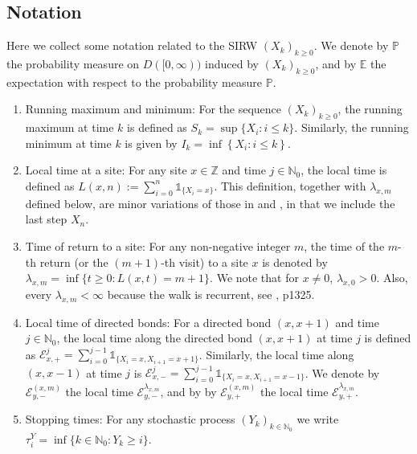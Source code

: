 \documentclass[EJP]{ejpecp} %
\begin{document}
\subsection{Notation}


	Here we collect some notation related to the SIRW $(X_k)_{k \ge 0}$.
	We denote by $\mathbb{P}$ the probability measure on $D([0,\infty))$ induced by $(X_k)_{k\geq 0}$, and by $\mathbb{E}$ the expectation with respect to the probability measure $\mathbb{P}$.
\begin{enumerate}
	\item Running maximum and minimum: For the sequence $(X_k)_{k \ge 0}$, the running maximum at time $k$ is defined as $S_k = \sup\{X_i : i \le k\}$. Similarly, the running minimum at time $k$ is given by $I_k = \inf \left\{X_i: i \le k\right\}$.
	\item
	Local time at a site: For any site $x \in \mathbb{Z}$ and time $j \in \mathbb{N}_0$, the local time is defined as $L(x,n):= \sum_{i=0}^n \mathbb{1}_{\{X_i=x\}}$. 
	This definition, together with $\lambda_{x, m}$ defined below, are minor variations of those in \cite{KMP23} and \cite{KP16}, in that we include the last step $X_n$.
	\item
	Time of return to a site: For any non-negative integer $m$, the time of the $m$-th return (or the $(m+1)$-th visit) to a site $x$ is denoted by $\lambda_{x,m} = \inf\{t \geq 0: L(x,t) = m+1\}$. 
	We note that for $x\neq 0$, $\lambda_{x,0} > 0$. Also, every $\lambda_{x,m}<\infty$ because the walk is recurrent, see \cite{T96}, p1325.
	\item
	Local time of directed bonds: For a directed bond $(x,x+1)$ and time $j \in \mathbb{N}_0$, the local time along the directed bond $(x, x+1)$ at time $j$ is defined as $\mathcal{E}^j_{x,+} = \sum_{i=0}^{j-1} \mathbb{1}_{\{X_i=x, X_{i+1} =x+1\}}$. 
	Similarly, the local time along $(x,x-1)$ at time $j$ is $\mathcal{E}^j_{x,-} = \sum_{i=0}^{j-1} \mathbb{1}_{\{X_i=x, X_{i+1} =x-1\}}$.
	We denote by $\mathcal{E}^{(x,m)}_{y, -}$ the local time $\mathcal{E}^{\lambda_{x,m}}_{y,-}$, and by by $\mathcal{E}^{(x,m)}_{y, +}$ the local time $\mathcal{E}^{\lambda_{x,m}}_{y,+}$.
	\item
	Stopping times: For any stochastic process $(Y_k)_{k \in \mathbb{N}_0}$ we write $\tau^Y_{i} = \inf \{k \in  \mathbb{N}_0: Y_k \ge  i\}$.
\end{enumerate}
\end{document}
